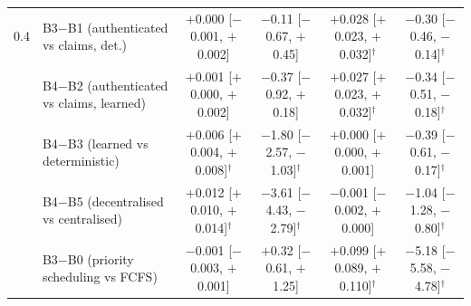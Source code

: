 \begin{table}[!t]
\begin{tabular}{llcccc}
\midrule
0.4 & B3$-$B1 (authenticated vs claims, det.) & $+$0.000 [$-$0.001, $+$0.002] & $-$0.11 [$-$0.67, $+$0.45] & $+$0.028 [$+$0.023, $+$0.032]$^\dagger$ & $-$0.30 [$-$0.46, $-$0.14]$^\dagger$ \\
 & B4$-$B2 (authenticated vs claims, learned) & $+$0.001 [$+$0.000, $+$0.002] & $-$0.37 [$-$0.92, $+$0.18] & $+$0.027 [$+$0.023, $+$0.032]$^\dagger$ & $-$0.34 [$-$0.51, $-$0.18]$^\dagger$ \\
 & B4$-$B3 (learned vs deterministic) & $+$0.006 [$+$0.004, $+$0.008]$^\dagger$ & $-$1.80 [$-$2.57, $-$1.03]$^\dagger$ & $+$0.000 [$+$0.000, $+$0.001] & $-$0.39 [$-$0.61, $-$0.17]$^\dagger$ \\
 & B4$-$B5 (decentralised vs centralised) & $+$0.012 [$+$0.010, $+$0.014]$^\dagger$ & $-$3.61 [$-$4.43, $-$2.79]$^\dagger$ & $-$0.001 [$-$0.002, $+$0.000] & $-$1.04 [$-$1.28, $-$0.80]$^\dagger$ \\
 & B3$-$B0 (priority scheduling vs FCFS) & $-$0.001 [$-$0.003, $+$0.001] & $+$0.32 [$-$0.61, $+$1.25] & $+$0.099 [$+$0.089, $+$0.110]$^\dagger$ & $-$5.18 [$-$5.58, $-$4.78]$^\dagger$ \\
\bottomrule
\end{tabular}
\end{table}
